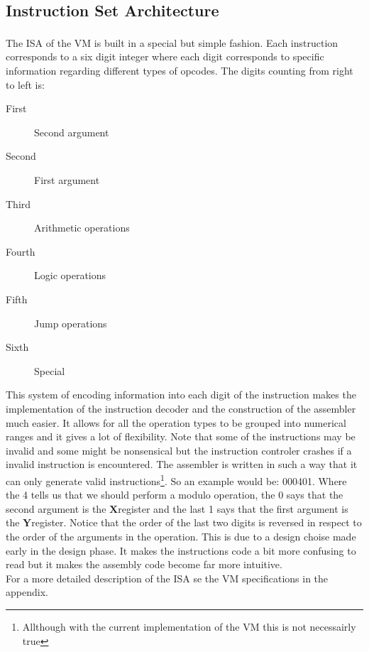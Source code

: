 \documentclass{article}
\newcommand{\x}{$\textbf{X}$}
\newcommand{\y}{$\textbf{Y}$}
\begin{document}
\subsection{Instruction Set Architecture}
The ISA\textsuperscript{\cite{ISA}} of the VM is built in a special but simple
fashion. Each instruction corresponds to a six digit integer 
where each digit corresponds to specific information regarding different types
of opcodes. The digits counting from right to left is: 

\begin{description}
  \item[First] Second argument
  \item[Second] First argument
  \item[Third] Arithmetic operations
  \item[Fourth] Logic operations
  \item[Fifth] Jump operations
  \item[Sixth] Special
\end{description}
This system of encoding information into each digit of the instruction makes the
implementation of the instruction decoder and the construction of the assembler
much easier.
It allows for all the operation types to be grouped into numerical ranges and it
gives  a lot of flexibility. Note that some of the instructions may be invalid
and some might be nonsensical but the instruction controler crashes if a invalid
instruction is encountered. The assembler is written in such a way that it can
only generate valid instructions\footnote{Allthough with the current
implementation of  the VM this is not necessairly true}.
So an example would be:
000401.
Where the 4 tells us that we should perform a modulo operation, 
the 0 says that the second argument is the \x register and the last 1 says 
that the first argument is the \y register. Notice that the order of
the last two digits is reversed in respect to the order of the arguments in
the operation.
This is due to a design choise made early in the design phase. It makes the
instructions code a bit more confusing to read but it makes the assembly code
become far more intuitive.\\
For a more detailed description of the ISA se the VM specifications in the
appendix.
\end{document}
